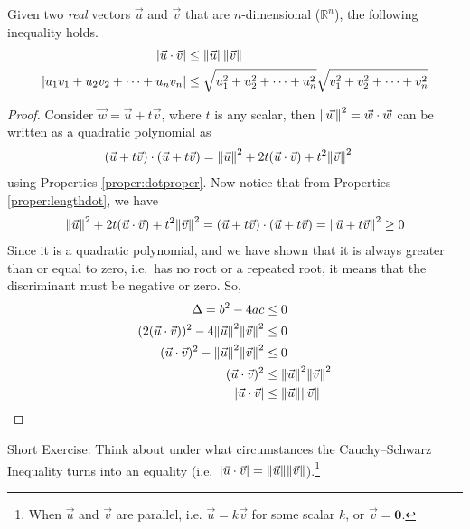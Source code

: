 \begin{thm}
\label{thm:CauchySch}
Given two \textit{real} vectors $\vec{u}$ and $\vec{v}$ that are $n$-dimensional ($\mathbb{R}^n$), the following inequality holds.
\begin{align*}
|\vec{u} \cdot \vec{v}| &\leq \norm{\vec{u}}\norm{\vec{v}} \\
|u_1v_1+u_2v_2+\cdots+u_nv_n| &\leq \sqrt{u_1^2+u_2^2+\cdots+u_n^2}\sqrt{v_1^2+v_2^2+\cdots+v_n^2}
\end{align*}
\end{thm}
\begin{proof}
Consider $\vec{w} = \vec{u} + t\vec{v}$, where $t$ is any scalar, then $\norm{\vec{w}}^2 = \vec{w}\cdot\vec{w}$ can be written as a quadratic polynomial as
\begin{align*}
(\vec{u} + t\vec{v}) \cdot (\vec{u} + t\vec{v}) &= \norm{\vec{u}}^2 + 2t(\vec{u} \cdot \vec{v}) + t^2\norm{\vec{v}}^2
\end{align*}
using Properties \ref{proper:dotproper}. Now notice that from Properties \ref{proper:lengthdot}, we have
\begin{align*}
\norm{\vec{u}}^2 + 2t(\vec{u} \cdot \vec{v}) + t^2\norm{\vec{v}}^2 =(\vec{u} + t\vec{v}) \cdot (\vec{u} + t\vec{v}) = \norm{\vec{u} + t\vec{v}}^2 \geq 0    
\end{align*}
Since it is a quadratic polynomial, and we have shown that it is always greater than or equal to zero, i.e.\ has no root or a repeated root, it means that the discriminant must be negative or zero. So,
\begin{align*}
\Delta = b^2 - 4ac &\leq 0 \\
(2(\vec{u} \cdot \vec{v}))^2 - 4\norm{\vec{u}}^2\norm{\vec{v}}^2 &\leq 0 \\
(\vec{u} \cdot \vec{v})^2 - \norm{\vec{u}}^2\norm{\vec{v}}^2 &\leq 0 \\
(\vec{u} \cdot \vec{v})^2 &\leq \norm{\vec{u}}^2\norm{\vec{v}}^2 \\
|\vec{u} \cdot \vec{v}| &\leq \norm{\vec{u}}\norm{\vec{v}}
\end{align*}
\end{proof}
Short Exercise: Think about under what circumstances the Cauchy–Schwarz Inequality turns into an equality (i.e.\ $|\vec{u} \cdot \vec{v}| = \norm{\vec{u}}\norm{\vec{v}}$).\footnote{When $\vec{u}$ and $\vec{v}$ are parallel, i.e. $\vec{u} = k\vec{v}$ for some scalar $k$, or $\vec{v} = \textbf{0}$.}

